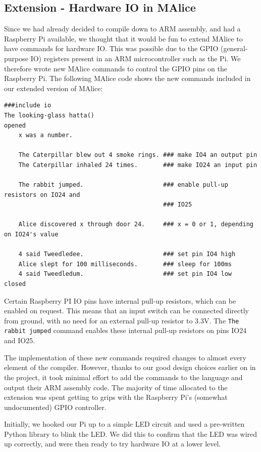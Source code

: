 \documentclass[11pt, notitlepage]{report}
\begin{document}
\subsection*{Extension - Hardware IO in MAlice}
Since we had already decided to compile down to ARM assembly, and had a Raspberry Pi available, we thought that it would be fun to extend MAlice to have commands for hardware IO. This was possible due to the GPIO (general-purpose IO) registers present in an ARM microcontroller such as the Pi. We therefore wrote new MAlice commands to control the GPIO pins on the Raspberry Pi. The following MAlice code shows the new commands included in our extended version of MAlice:

\begin{verbatim}
###include io
The looking-glass hatta()
opened
    x was a number.

    The Caterpillar blew out 4 smoke rings. ### make IO4 an output pin
    The Caterpillar inhaled 24 times.       ### make IO24 an input pin

    The rabbit jumped.                      ### enable pull-up resistors on IO24 and 
                                            ### IO25

    Alice discovered x through door 24.     ### x = 0 or 1, depending on IO24's value

    4 said Tweedledee.                      ### set pin IO4 high
    Alice slept for 100 milliseconds.       ### sleep for 100ms
    4 said Tweedledum.                      ### set pin IO4 low
closed
\end{verbatim}

Certain Raspberry PI IO pins have internal pull-up resistors, which can be enabled on request. This means that an input switch can be connected directly from ground, with no need for an external pull-up resistor to 3.3V. The \texttt{The rabbit jumped} command enables these internal pull-up resistors on pins IO24 and IO25.

The implementation of these new commands required changes to almost every element of the compiler. However, thanks to our good design choices earlier on in the project, it took minimal effort to add the commands to the language and output their ARM assembly code. The majority of time allocated to the extension was spent getting to grips with the Raspberry Pi's (somewhat undocumented) GPIO controller.

Initially, we hooked our Pi up to a simple LED circuit and used a pre-written Python library to blink the LED. We did this to confirm that the LED was wired up correctly, and were then ready to try hardware IO at a lower level.
\end{document}
